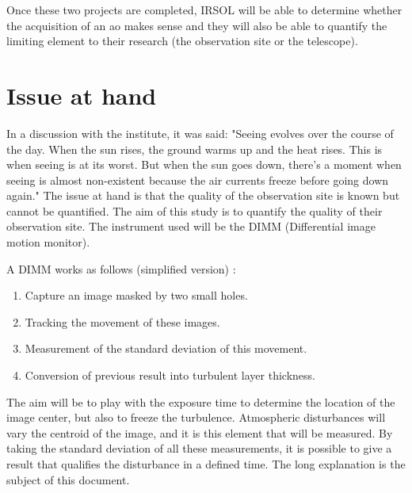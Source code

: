 Once these two projects are completed, \Gls{IRSOL} will be able to determine whether the acquisition of an \acrfull{ao} makes sense
and they will also be able to quantify the limiting element to their research (the observation site or the telescope).



\section{Issue at hand}
In a discussion with the institute, it was said: "Seeing evolves over the course of the day.
When the sun rises, the ground warms up and the heat rises. This is when seeing is at its worst.
But when the sun goes down, there's a moment when seeing is almost non-existent because the air currents freeze before going down again."
\bigbreak
The issue at hand is that the quality of the observation site is known but cannot be quantified.
The aim of this study is to quantify the quality of their observation site.
The instrument used will be the \Gls{DIMM} (Differential image motion monitor).

A \Gls{DIMM} works as follows (simplified version) :
\begin{enumerate}
    \item Capture an image masked by two small holes.
    \item Tracking the movement of these images.
    \item Measurement of the standard deviation of this movement.
    \item Conversion of previous result into turbulent layer thickness.
\end{enumerate}
The aim will be to play with the exposure time to determine the location of the image center, but also to freeze the turbulence.
\newline
Atmospheric disturbances will vary the centroid of the image, and it is this element that will be measured.
By taking the standard deviation of all these measurements, it is possible to give a result that qualifies the disturbance in a defined time.
\newline
The long explanation is the subject of this document.

